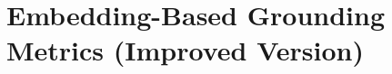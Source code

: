 \documentclass[11pt,a4paper]{article}
\begin{document}
\section{Embedding-Based Grounding Metrics (Improved Version)}





\end{document}
